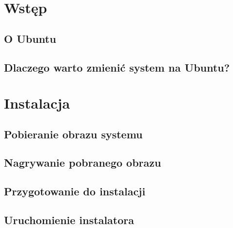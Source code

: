 \documentclass[a4paper,11pt,oneside]{mwart}
\begin{document}


\section{Wstęp}
	
	\subsection{O Ubuntu}
		
	\subsection{Dlaczego warto zmienić system na Ubuntu?}
		
\section{Instalacja}
	\subsection{Pobieranie obrazu systemu}
		
	\subsection{Nagrywanie pobranego obrazu}
		
		
	\subsection{Przygotowanie do instalacji}
		
	\subsection{Uruchomienie instalatora}
		
		
\end{document}
